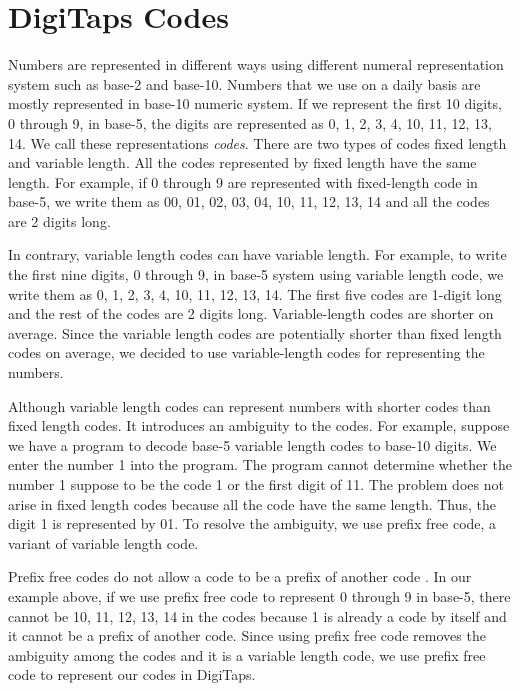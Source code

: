 \section{DigiTaps Codes}
\label{sec:codes}

Numbers are represented in different ways using different numeral representation system such as base-2 and base-10. Numbers that we use on a daily basis are mostly represented in base-10 numeric system. If we represent the first 10 digits, 0 through 9, in base-5, the digits are represented as 0, 1, 2, 3, 4, 10, 11, 12, 13, 14. We call these representations \textit{codes}. There are two types of codes fixed length and variable length. All the codes represented by fixed length have the same length. For example, if 0 through 9 are represented with fixed-length code in base-5, we write them as 00, 01, 02, 03, 04, 10, 11, 12, 13, 14 and all the codes are 2 digits long.
\par
In contrary, variable length codes can have variable length. For example, to write the first nine digits, 0 through 9, in base-5 system using variable length code, we write them as 0, 1, 2, 3, 4, 10, 11, 12, 13, 14. The first five codes are 1-digit long and the rest of the codes are 2 digits long. Variable-length codes are shorter on average. Since the variable length codes are potentially shorter than fixed length codes on average, we decided to use variable-length codes for representing the numbers.
\par
Although variable length codes can represent numbers with shorter codes than fixed length codes. It introduces an ambiguity to the codes. For example, suppose we have a program to decode base-5 variable length codes to base-10 digits. We enter the number 1 into the program. The program cannot determine whether the number 1 suppose to be the code 1 or the first digit of 11. The problem does not arise in fixed length codes because all the code have the same length. Thus, the digit 1 is represented by 01. To resolve the ambiguity, we use prefix free code, a variant of variable length code.
\par
Prefix free codes do not allow a code to be a prefix of another code \cite{huf52}. In our example above, if we use prefix free code to represent 0 through 9 in base-5, there cannot be 10, 11, 12, 13, 14 in the codes because 1 is already a code by itself and it cannot be a prefix of another code. Since using prefix free code removes the ambiguity among the codes and it is a variable length code, we use prefix free code to represent our codes in DigiTaps.

